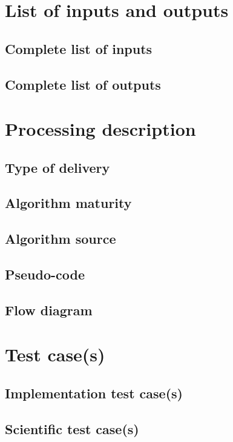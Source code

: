 \documentclass{article}
\begin{document}
\section{List of inputs and outputs}
\subsection{Complete list of inputs}
\subsection{Complete list of outputs}

\section{Processing description}
\subsection{Type of delivery}
\subsection{Algorithm maturity}
\subsection{Algorithm source}
\subsection{Pseudo-code}
\subsection{Flow diagram}

\section{Test case(s)}
\subsection{Implementation test case(s)}
\subsection{Scientific test case(s)}
\end{document}
